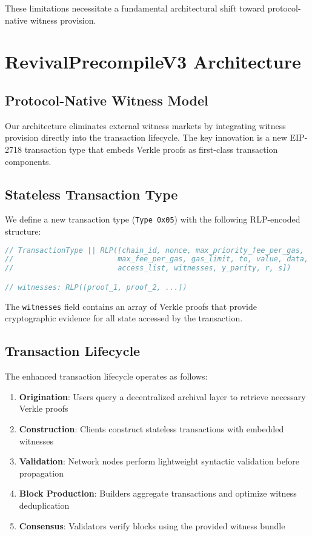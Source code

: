 \documentclass{article}
\begin{document}
These limitations necessitate a fundamental architectural shift toward protocol-native witness provision.

\section{RevivalPrecompileV3 Architecture}

\subsection{Protocol-Native Witness Model}

Our architecture eliminates external witness markets by integrating witness provision directly into the transaction lifecycle. The key innovation is a new EIP-2718 transaction type that embeds Verkle proofs as first-class transaction components.

\subsection{Stateless Transaction Type}

We define a new transaction type (\texttt{Type 0x05}) with the following RLP-encoded structure:

\begin{lstlisting}[language=C,caption={Stateless Transaction Structure},label={lst:tx-structure}]
// TransactionType || RLP([chain_id, nonce, max_priority_fee_per_gas, 
//                        max_fee_per_gas, gas_limit, to, value, data, 
//                        access_list, witnesses, y_parity, r, s])

// witnesses: RLP([proof_1, proof_2, ...])
\end{lstlisting}

The \texttt{witnesses} field contains an array of Verkle proofs that provide cryptographic evidence for all state accessed by the transaction.

\subsection{Transaction Lifecycle}

The enhanced transaction lifecycle operates as follows:

\begin{enumerate}
\item \textbf{Origination}: Users query a decentralized archival layer to retrieve necessary Verkle proofs
\item \textbf{Construction}: Clients construct stateless transactions with embedded witnesses
\item \textbf{Validation}: Network nodes perform lightweight syntactic validation before propagation
\item \textbf{Block Production}: Builders aggregate transactions and optimize witness deduplication
\item \textbf{Consensus}: Validators verify blocks using the provided witness bundle
\end{enumerate}
\end{document}
